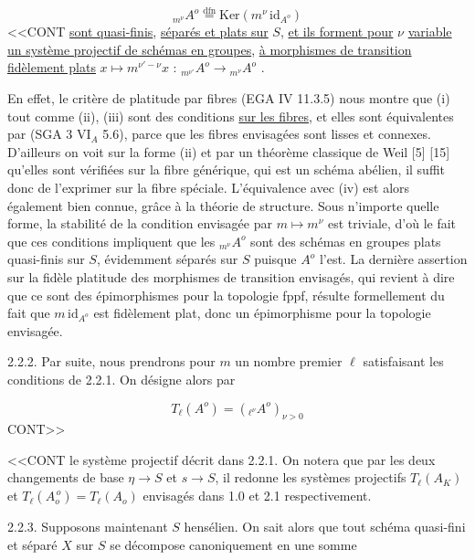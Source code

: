 \begin{equation*}
{}_{m^\nu}A^o \overset{\mathrm{dfn}}{=} \mathrm{Ker}(m^\nu \,\mathrm{id}_{A^o})
\end{equation*}
<<CONT \underline{sont quasi-finis}, \underline{séparés et plats sur} $S$, \underline{et ils forment pour} $\nu$ \underline{variable} \underline{un système projectif de schémas en groupes}, \underline{à morphismes de transition fidèlement plats} $x \longmapsto m^{\nu'-\nu}x$ : ${}_{m^{\nu'}}A^o \longrightarrow {}_{m^\nu}A^o$ .

En effet, le critère de platitude par fibres (EGA IV 11.3.5) nous montre que (i) tout comme (ii), (iii) sont des conditions \underline{sur les fibres}, et elles sont équivalentes par (SGA 3 $\mathrm{VI}_A$ 5.6), parce que les fibres envisagées sont lisses et connexes. D'ailleurs on voit sur la forme (ii) et par un théorème classique de Weil [5] [15] qu'elles sont vérifiées sur la fibre générique, qui est un schéma abélien, il suffit donc de l'exprimer sur la fibre spéciale. L'équivalence avec (iv) est alors également bien connue, grâce à la théorie de structure. Sous n'importe quelle forme, la stabilité de la condition envisagée par $m \longmapsto m^\nu$ est triviale, d'où le fait que ces conditions impliquent que les ${}_{m^\nu}A^o$ sont des schémas en groupes plats quasi-finis sur $S$, évidemment séparés sur $S$ puisque $A^o$ l'est. La dernière assertion sur la fidèle platitude des morphismes de transition envisagés, qui revient à dire que ce sont des épimorphismes pour la topologie fppf, résulte formellement du fait que $m \,\mathrm{id}_{A^o}$ est fidèlement plat, donc un épimorphisme pour la topologie envisagée.

2.2.2.  Par suite, nous prendrons pour $m$ un nombre premier $\ell$ satisfaisant les conditions de 2.2.1. On désigne alors par

\begin{equation}\tag{2.2.2.1}
T_\ell(A^o) = ({}_{\ell^\nu}A^o)_{\nu > 0}
\end{equation}
CONT>>



<<CONT le système projectif décrit dans 2.2.1. On notera que par les deux changements de base $\eta \longrightarrow S$ et $s \longrightarrow S$, il redonne les systèmes projectifs $T_{\ell}(A_{K})$ et $T_{\ell}(A_{o}^{\,o}) = T_{\ell}(A_{o})$ envisagés dans 1.0 et 2.1 respectivement.

2.2.3. Supposons maintenant $S$ hensélien. On sait alors que tout schéma quasi-fini et séparé $X$ sur $S$ se décompose canoniquement en une somme

